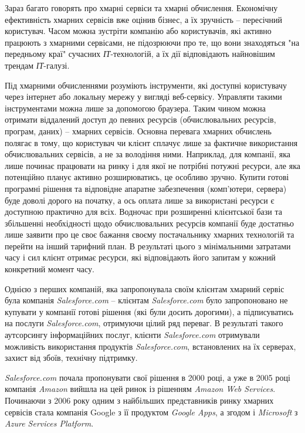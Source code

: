 Зараз багато говорять про хмарні сервіси та хмарні обчислення. Економічну ефективність хмарних сервісів вже оцінив бізнес, а їх зручність – пересічний користувач. Часом можна зустріти компанію або користувачів, які активно працюють з хмарними сервісами, не підозрюючи про те, що вони знаходяться "на передньому краї" сучасних {\itshape ІТ}-технологій, а їх дії відповідають найновішим трендам {\itshape ІТ}-галузі.

Під хмарними обчисленнями розуміють інструменти, які доступні користувачу через інтернет або локальну мережу у вигляді веб-сервісу. Управляти такими інструментами можна лише за допомогою браузера. Таким чином можна отримати віддалений доступ до певних ресурсів (обчислювальних ресурсів, програм, даних) – хмарних сервісів. Основна перевага хмарних обчислень полягає в тому, що користувач чи клієнт сплачує лише за фактичне використання обчислювальних сервісів, а не за володіння ними. Наприклад, для компанії, яка лише починає працювати на ринку і для якої не потрібні потужні ресурси, але яка потенційно планує активно розширюватись, це особливо зручно. Купити готові програмні рішення та відповідне апаратне забезпечення (комп’ютери, сервера) буде доволі дорого на початку, а ось оплата лише за використані ресурси є доступною практично для всіх. Водночас при розширенні клієнтської бази та збільшенні необхідності щодо обчислювальних ресурсів компанії буде достатньо лише заявити про це своє бажання своєму постачальнику хмарних технологій та перейти на інший тарифний план. В результаті цього з мінімальними затратами часу і сил клієнт отримає ресурси, які відповідають його запитам у кожний конкретний момент часу.

Однією з перших компаній, яка запропонувала своїм клієнтам хмарний сервіс була компанія {\itshape Salesforce.com} – клієнтам {\itshape Salesforce.com} було запропоновано не купувати у компанії готові рішення (які були досить дорогими), а підписуватись на послуги {\itshape Salesforce.com}, отримуючи цілий ряд переваг. В результаті такого аутсорсингу інформаційних послуг, клієнти {\itshape Salesforce.com} отримували можливість використання продуктів {\itshape Salesforce.com}, встановлених на їх серверах, захист від збоїв, технічну підтримку.

{\itshape Salesforce.com} почала пропонувати свої рішення в 2000 році, а уже в 2005 році компанія {\itshape Amazon} вийшла на цей ринок із рішенням {\itshape \dq Amazon Web Services\dq}. Починаючи з 2006 року одним з найбільших представників ринку хмарних сервісів стала компанія Google з її продуктом {\itshape \dq Google Apps\dq}, а згодом і {\itshape Microsoft} з {\itshape \dq Azure Services Platform\dq}.


